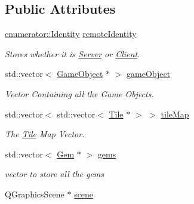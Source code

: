 \subsection*{Public Attributes}
\begin{DoxyCompactItemize}
\item 
\hypertarget{classReadInput_adc606d86ae9c132ab1621cee0ea75bf7}{\hyperlink{namespaceenumerator_aa4c03441b2e09279e43235eb80525c6d}{enumerator\-::\-Identity} \hyperlink{classReadInput_adc606d86ae9c132ab1621cee0ea75bf7}{remote\-Identity}}\label{classReadInput_adc606d86ae9c132ab1621cee0ea75bf7}

\begin{DoxyCompactList}\small\item\em Stores whether it is \hyperlink{classServer}{Server} or \hyperlink{classClient}{Client}. \end{DoxyCompactList}\item 
\hypertarget{classReadInput_a21ac8a09fc880cd70eb4bdfc61d05007}{std\-::vector$<$ \hyperlink{classGameObject}{Game\-Object} $\ast$ $>$ \hyperlink{classReadInput_a21ac8a09fc880cd70eb4bdfc61d05007}{game\-Object}}\label{classReadInput_a21ac8a09fc880cd70eb4bdfc61d05007}

\begin{DoxyCompactList}\small\item\em Vector Containing all the Game Objects. \end{DoxyCompactList}\item 
\hypertarget{classReadInput_a074e31396ae2e02327562d9233b6c22e}{std\-::vector$<$ std\-::vector$<$ \hyperlink{classTile}{Tile} $\ast$ $>$ $>$ \hyperlink{classReadInput_a074e31396ae2e02327562d9233b6c22e}{tile\-Map}}\label{classReadInput_a074e31396ae2e02327562d9233b6c22e}

\begin{DoxyCompactList}\small\item\em The \hyperlink{classTile}{Tile} Map Vector. \end{DoxyCompactList}\item 
\hypertarget{classReadInput_ac69175ef5ebd6c14ac491ade5a2409a8}{std\-::vector$<$ \hyperlink{classGem}{Gem} $\ast$ $>$ \hyperlink{classReadInput_ac69175ef5ebd6c14ac491ade5a2409a8}{gems}}\label{classReadInput_ac69175ef5ebd6c14ac491ade5a2409a8}

\begin{DoxyCompactList}\small\item\em vector to store all the gems \end{DoxyCompactList}\item 
\hypertarget{classReadInput_a6ef3ea2e71749ad16f4bcd0bdae740c4}{Q\-Graphics\-Scene $\ast$ \hyperlink{classReadInput_a6ef3ea2e71749ad16f4bcd0bdae740c4}{scene}}\label{classReadInput_a6ef3ea2e71749ad16f4bcd0bdae740c4}


\end{DoxyCompactItemize}

